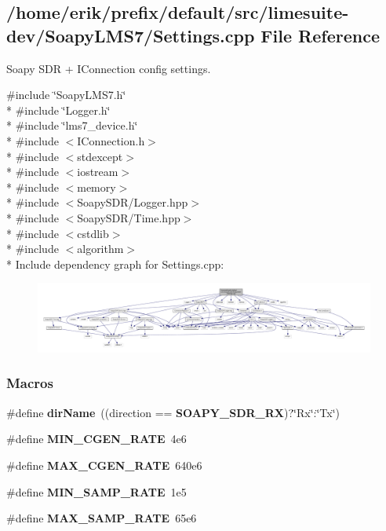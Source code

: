 \subsection{/home/erik/prefix/default/src/limesuite-\/dev/\+Soapy\+L\+M\+S7/\+Settings.cpp File Reference}
\label{Settings_8cpp}


Soapy S\+DR + I\+Connection config settings.  


{\ttfamily \#include \char`\"{}Soapy\+L\+M\+S7.\+h\char`\"{}}\\*
{\ttfamily \#include \char`\"{}Logger.\+h\char`\"{}}\\*
{\ttfamily \#include \char`\"{}lms7\+\_\+device.\+h\char`\"{}}\\*
{\ttfamily \#include $<$I\+Connection.\+h$>$}\\*
{\ttfamily \#include $<$stdexcept$>$}\\*
{\ttfamily \#include $<$iostream$>$}\\*
{\ttfamily \#include $<$memory$>$}\\*
{\ttfamily \#include $<$Soapy\+S\+D\+R/\+Logger.\+hpp$>$}\\*
{\ttfamily \#include $<$Soapy\+S\+D\+R/\+Time.\+hpp$>$}\\*
{\ttfamily \#include $<$cstdlib$>$}\\*
{\ttfamily \#include $<$algorithm$>$}\\*
Include dependency graph for Settings.\+cpp\+:
\nopagebreak
\begin{figure}[H]
\begin{center}
\leavevmode
\includegraphics[width=350pt]{dc/d21/Settings_8cpp__incl}
\end{center}
\end{figure}
\subsubsection*{Macros}
\begin{DoxyCompactItemize}
\item 
\#define {\bf dir\+Name}~((direction == {\bf S\+O\+A\+P\+Y\+\_\+\+S\+D\+R\+\_\+\+RX})?\char`\"{}Rx\char`\"{}\+:\char`\"{}Tx\char`\"{})
\item 
\#define {\bf M\+I\+N\+\_\+\+C\+G\+E\+N\+\_\+\+R\+A\+TE}~4e6
\item 
\#define {\bf M\+A\+X\+\_\+\+C\+G\+E\+N\+\_\+\+R\+A\+TE}~640e6
\item 
\#define {\bf M\+I\+N\+\_\+\+S\+A\+M\+P\+\_\+\+R\+A\+TE}~1e5
\item 
\#define {\bf M\+A\+X\+\_\+\+S\+A\+M\+P\+\_\+\+R\+A\+TE}~65e6
\end{DoxyCompactItemize}


